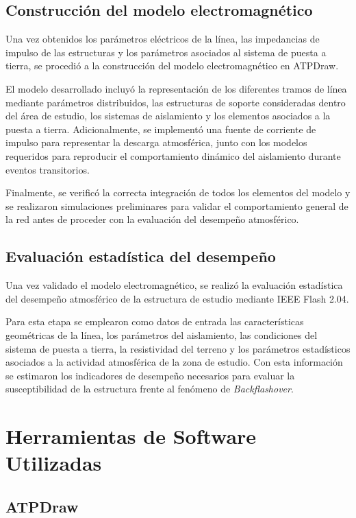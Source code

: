 \documentclass[12pt,letterpaper]{article}
\begin{document}
\subsection{Construcción del modelo electromagnético}

Una vez obtenidos los parámetros eléctricos de la línea, las impedancias de impulso de las estructuras y los parámetros asociados al sistema de puesta a tierra, se procedió a la construcción del modelo electromagnético en ATPDraw.

El modelo desarrollado incluyó la representación de los diferentes tramos de línea mediante parámetros distribuidos, las estructuras de soporte consideradas dentro del área de estudio, los sistemas de aislamiento y los elementos asociados a la puesta a tierra. Adicionalmente, se implementó una fuente de corriente de impulso para representar la descarga atmosférica, junto con los modelos requeridos para reproducir el comportamiento dinámico del aislamiento durante eventos transitorios.

Finalmente, se verificó la correcta integración de todos los elementos del modelo y se realizaron simulaciones preliminares para validar el comportamiento general de la red antes de proceder con la evaluación del desempeño atmosférico.

\subsection{Evaluación estadística del desempeño}

Una vez validado el modelo electromagnético, se realizó la evaluación estadística del desempeño atmosférico de la estructura de estudio mediante IEEE Flash 2.04.

Para esta etapa se emplearon como datos de entrada las características geométricas de la línea, los parámetros del aislamiento, las condiciones del sistema de puesta a tierra, la resistividad del terreno y los parámetros estadísticos asociados a la actividad atmosférica de la zona de estudio. Con esta información se estimaron los indicadores de desempeño necesarios para evaluar la susceptibilidad de la estructura frente al fenómeno de \textit{Backflashover}.

\section{Herramientas de Software Utilizadas}

\subsection{ATPDraw}
\end{document}

